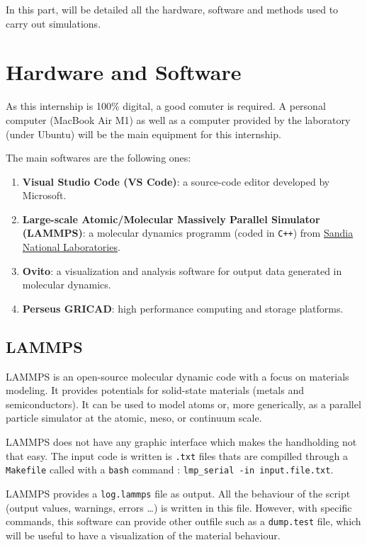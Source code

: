 
In this part, will be detailed all the hardware, software and methods used to carry out simulations. 

\section{Hardware and Software}

    As this internship is 100\% digital, a good comuter is required. A personal computer (MacBook Air M1) as well as a computer provided by the laboratory (under Ubuntu) will be the main equipment for this internship. \medskip

    The main softwares are the following ones:

    \begin{enumerate}[\hspace{3em}$\bullet$]
        \item \textbf{Visual Studio Code (VS Code)}: a source-code editor developed by Microsoft.
        \item \textbf{Large-scale Atomic/Molecular Massively Parallel Simulator (LAMMPS)}: a molecular dynamics programm (coded in \verb|C++|) from \href{http://www.sandia.gov}{Sandia National Laboratories}.
        \item \textbf{Ovito}: a visualization and analysis software for output data generated in molecular dynamics. 
        \item \textbf{Perseus GRICAD}: high performance computing and storage platforms.  
    \end{enumerate}

    \subsection{LAMMPS}

        LAMMPS is an open-source molecular dynamic code with a focus on materials modeling. It provides potentials for solid-state materials (metals and semiconductors). It can be used to model atoms or, more generically, as a parallel particle simulator at the atomic, meso, or continuum scale. \medskip

        LAMMPS does not have any graphic interface which makes the handholding not that easy. The input code is written is \verb|.txt| files thats are compilled through a \verb|Makefile| called with a \verb|bash| command : \verb|lmp_serial -in input.file.txt|.
        
        LAMMPS provides a \verb|log.lammps| file as output. All the behaviour of the script (output values, warnings, errors \dots) is written in this file. However, with specific commands, this software can provide other outfile such as a \verb|dump.test| file, which will be useful to have a visualization of the material behaviour. \medskip


